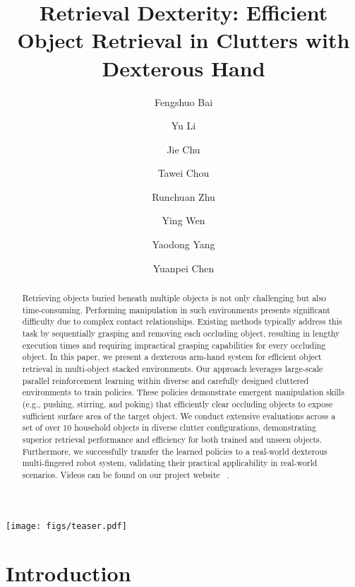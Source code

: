 \documentclass[10pt, a4paper, logo, twocolumn, copyright]{psibot} %
\title{Retrieval Dexterity: Efficient Object Retrieval in Clutters with Dexterous Hand}
\author[1,2]{Fengshuo Bai}
\author[2,3]{Yu Li}
\author[1,2]{Jie Chu}
\author[2,3]{Tawei Chou}
\author[3]{Runchuan Zhu}
\author[1,\dag]{Ying Wen}
\author[2,3,\dag]{Yaodong Yang}
\author[2,3,\dag]{Yuanpei Chen}
\affil[1]{Shanghai Jiao Tong University}
\affil[2]{PKU-PsiBot Joint Lab}
\affil[3]{Peking University}
\begin{document}
\maketitle

\begin{strip}
    \centering
    \texttt{[image: figs/teaser.pdf]}
    \label{fig:teaser}
\end{strip}

\begin{abstract}
Retrieving objects buried beneath multiple objects is not only challenging but also time-consuming. Performing manipulation in such environments presents significant difficulty due to complex contact relationships. Existing methods typically address this task by sequentially grasping and removing each occluding object, resulting in lengthy execution times and requiring impractical grasping capabilities for every occluding object. In this paper, we present a dexterous arm-hand system for efficient object retrieval in multi-object stacked environments. Our approach leverages large-scale parallel reinforcement learning within diverse and carefully designed cluttered environments to train policies. These policies demonstrate emergent manipulation skills (e.g., pushing, stirring, and poking) that efficiently clear occluding objects to expose sufficient surface area of the target object. We conduct extensive evaluations across a set of over 10 household objects in diverse clutter configurations, demonstrating superior retrieval performance and efficiency for both trained and unseen objects. Furthermore, we successfully transfer the learned policies to a real-world dexterous multi-fingered robot system, validating their practical applicability in real-world scenarios. Videos can be found on our project website ~\href{https://ChangWinde.github.io/RetrDex}{\color[HTML]{2D3C8F}{https://ChangWinde.github.io/RetrDex}}.
\end{abstract}

\section{Introduction}
\end{document}
